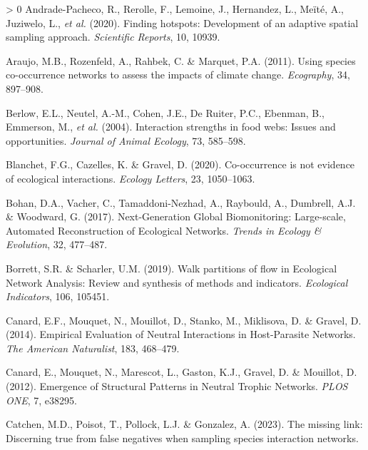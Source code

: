 \documentclass[10pt,oneside]{article}
\newlength{\cslhangindent}
\newenvironment{CSLReferences}[3] %
 {%
  \setlength{\parindent}{0pt}
  \ifodd #1 \everypar{\setlength{\hangindent}{\cslhangindent}}\ignorespaces\fi
  \ifnum #2 > 0
  \setlength{\parskip}{#2\baselineskip}
  \fi
 }%
 {}
\begin{document}
\hypertarget{refs}{}
\begin{CSLReferences}{1}{0}
\leavevmode\hypertarget{ref-Andrade-Pacheco2020Finding}{}%
Andrade-Pacheco, R., Rerolle, F., Lemoine, J., Hernandez, L., Meïté, A.,
Juziwelo, L., \emph{et al.} (2020). Finding hotspots: Development of an
adaptive spatial sampling approach. \emph{Scientific Reports}, 10,
10939.

\leavevmode\hypertarget{ref-Araujo2011Usinga}{}%
Araujo, M.B., Rozenfeld, A., Rahbek, C. \& Marquet, P.A. (2011). Using
species co-occurrence networks to assess the impacts of climate change.
\emph{Ecography}, 34, 897--908.

\leavevmode\hypertarget{ref-Berlow2004Interaction}{}%
Berlow, E.L., Neutel, A.-M., Cohen, J.E., De Ruiter, P.C., Ebenman, B.,
Emmerson, M., \emph{et al.} (2004). Interaction strengths in food webs:
Issues and opportunities. \emph{Journal of Animal Ecology}, 73,
585--598.

\leavevmode\hypertarget{ref-Blanchet2020Cooccurrencea}{}%
Blanchet, F.G., Cazelles, K. \& Gravel, D. (2020). Co-occurrence is not
evidence of ecological interactions. \emph{Ecology Letters}, 23,
1050--1063.

\leavevmode\hypertarget{ref-Bohan2017NexGlo}{}%
Bohan, D.A., Vacher, C., Tamaddoni-Nezhad, A., Raybould, A., Dumbrell,
A.J. \& Woodward, G. (2017). Next-Generation Global Biomonitoring:
Large-scale, Automated Reconstruction of Ecological Networks.
\emph{Trends in Ecology \& Evolution}, 32, 477--487.

\leavevmode\hypertarget{ref-Borrett2019Walk}{}%
Borrett, S.R. \& Scharler, U.M. (2019). Walk partitions of flow in
Ecological Network Analysis: Review and synthesis of methods and
indicators. \emph{Ecological Indicators}, 106, 105451.

\leavevmode\hypertarget{ref-Canard2014Empiricala}{}%
Canard, E.F., Mouquet, N., Mouillot, D., Stanko, M., Miklisova, D. \&
Gravel, D. (2014). Empirical Evaluation of Neutral Interactions in
Host-Parasite Networks. \emph{The American Naturalist}, 183, 468--479.

\leavevmode\hypertarget{ref-Canard2012Emergencea}{}%
Canard, E., Mouquet, N., Marescot, L., Gaston, K.J., Gravel, D. \&
Mouillot, D. (2012). Emergence of Structural Patterns in Neutral Trophic
Networks. \emph{PLOS ONE}, 7, e38295.

\leavevmode\hypertarget{ref-Catchen2023Missinga}{}%
Catchen, M.D., Poisot, T., Pollock, L.J. \& Gonzalez, A. (2023). The
missing link: Discerning true from false negatives when sampling species
interaction networks.


\end{CSLReferences}
\end{document}
